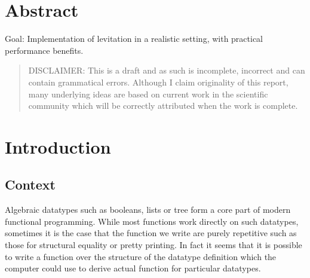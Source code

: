 \documentclass{ituthesis}
\begin{document}

\frontmatter

\thetitlepage
\newpage

\chapter*{Abstract}
Goal: Implementation of levitation in a realistic setting, with practical performance benefits.
\blockquote{DISCLAIMER: This is a draft and as such is incomplete, incorrect and can contain grammatical errors.
Although I claim originality of this report, many underlying ideas are based on current work in the scientific community which will be correctly attributed
when the work is complete.}

\cleardoublepage
\setcounter{tocdepth}{1}
\tableofcontents

\mainmatter

\midsloppy
\sloppybottom

\chapter{Introduction}
\label{cha:Intoduction}
\section{Context}
\label{sec:Context}
Algebraic datatypes such as booleans, lists or tree form a core part of modern functional programming.
While most functions work directly on such datatypes, sometimes it is the case that the function we write are purely repetitive such as those for structural equality or pretty printing.
In fact it seems that it is possible to write a function over the structure of the datatype definition which the computer could use to derive actual function for particular datatypes.
\end{document}

